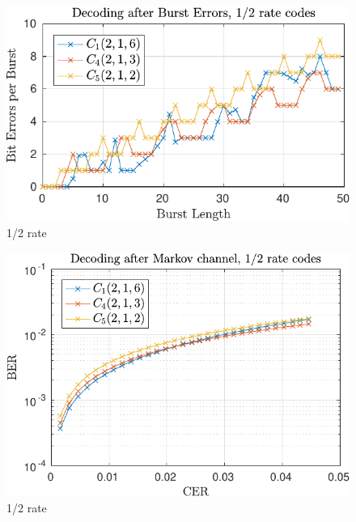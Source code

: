 \begin{figure}
\centering
\includegraphics[scale=1]{../figures/extra12burst.pdf} 
\caption{1/2 rate\label{fig:constantCodeRateBurstFigure}}
\end{figure}

\begin{figure}
\centering
\includegraphics[scale=1]{../figures/extra12markov.pdf} 
\caption{1/2 rate\label{fig:constantCodeRateMarkovFigure}}
\end{figure}
